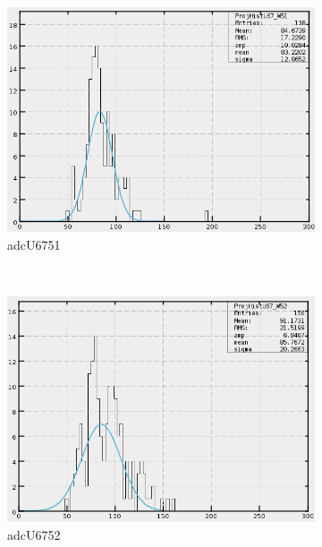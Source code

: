 \begin{figure}[h]
\begin{subfigure}[h]{0.3\textwidth}
        \includegraphics[width=\textwidth, keepaspectratio = true]{adcU67_51}
        \caption{adcU6751}
        \label{fig:adcU67_51}
    \end{subfigure}
    ~
    \begin{subfigure}[h]{0.3\textwidth}
        \centering
        \includegraphics[width=\textwidth, keepaspectratio = true]{adcU67_52}
        \caption{adcU6752}
        \label{fig:adcU67_52}
    \end{subfigure}
    \\
    \begin{subfigure}[h]{0.3\textwidth}
        \centering

\end{subfigure}
\end{figure}
